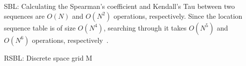 SBL: Calculating the Spearman’s coefficient and Kendall’s Tau
 between two sequences are $O(N)$ and $O(N^2)$ operations,
 respectively. Since the location sequence table is of size
 $O(N^4)$, searching through it takes $O(N^5)$ and $O(N^6)$ operations,
 respectively~\cite{yedavalli2008sequence}.

 RSBL: Discrete space grid  M  
\fi


